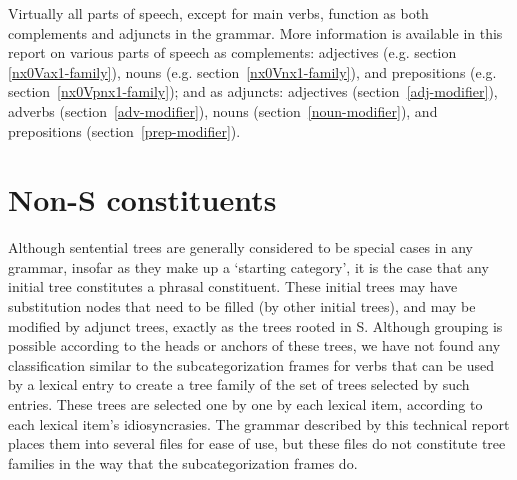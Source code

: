 Virtually all parts of speech, except for main verbs, function as both
complements and adjuncts in the grammar.  More information is available in this
report on various parts of speech as complements: adjectives (e.g. section
\ref{nx0Vax1-family}), nouns (e.g.  section~\ref{nx0Vnx1-family}), and
prepositions (e.g. section~\ref{nx0Vpnx1-family}); and as adjuncts: adjectives
(section~\ref{adj-modifier}), adverbs (section~\ref{adv-modifier}), nouns
(section~\ref{noun-modifier}), and prepositions (section~\ref{prep-modifier}).

\section{Non-S constituents}

Although sentential trees are generally considered to be special cases
in any grammar, insofar as they make up a `starting category', it is
the case that any initial tree constitutes a phrasal constituent.
These initial trees may have substitution nodes that need to be filled
(by other initial trees), and may be modified by adjunct trees,
exactly as the trees rooted in S.  Although grouping is possible
according to the heads or anchors of these trees, we have not found
any classification similar to the subcategorization frames for verbs
that can be used by a lexical entry to create a tree family of the set
of trees selected by such entries.  These trees are selected one by
one by each lexical item, according to each lexical item's
idiosyncrasies.  The grammar described by this technical report places
them into several files for ease of use, but these files do not
constitute tree families in the way that the subcategorization frames
do.


